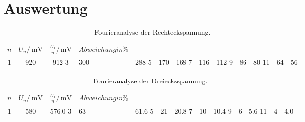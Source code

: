 \section{Auswertung}
\label{sec:Auswertung}
\begin{table}
	\centering
	\begin{tabular}{S[table-format=2.0] S[table-format=3.0] S[table-format=3.0] }
	\toprule
	{$n$} & {$U_n/\:\si{\milli\volt}$} & {$\frac{U_1}{n}/\:\si{\milli\volt}$} & {$Abweichung in \%$} \\
	\midrule

 1 & 920 & 912
 3 & 300 & 288
 5 & 170 & 168
 7 & 116 & 112
 9 &  86 &  80
11 &  64 &  56
	\bottomrule
	\end{tabular}
	\caption{Fourieranalyse der Rechteckspannung.}
	\label{tab:FA_RE}
\end{table}
 


\begin{table}
	\centering
	\begin{tabular}{S[table-format=2.0] S[table-format=3.1] S[table-format=3.0] }
	\toprule
	{$n$} & {$U_n/\:\si{\milli\volt}$} & {$\frac{U_1}{n}/\:\si{\milli\volt}$} & {$Abweichung in \%$} \\
	\midrule

 1 & 580 & 576.0
 3 &  63 &  61.6
 5 &  21 &  20.8
 7 &  10 &  10.4
 9 &   6 &   5.6
11 &   4 &   4.0
	\bottomrule
	\end{tabular}
	\caption{Fourieranalyse der Dreiecksspannung.}
	\label{tab:FA_RE}
\end{table}



